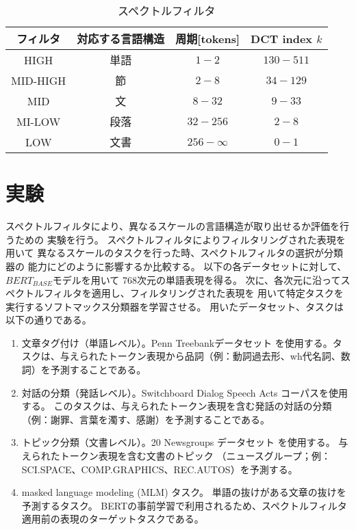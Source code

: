 \documentclass{jsarticle}
\begin{document}
\begin{table}[H]
  \begin{center}
    \caption{スペクトルフィルタ}
    \begin{tabular}{cccc} \hline
      フィルタ  & 対応する言語構造 & 周期[tokens] & DCT index $k$  \\ \hline 
      HIGH     & 単語 & $1-2$        & $130 - 511$    \\
      MID-HIGH & 節   & $2-8$        & $34 - 129$  \\
      MID      & 文   & $8-32$       & $9 - 33$  \\ 
      MI-LOW   & 段落 & $32-256$     & $2 - 8$ \\
      LOW      & 文書 & $256-\infty$ & $0 - 1$ 
      \\ \hline
    \end{tabular}
    \label{tab:tab1}
  \end{center}
\end{table}

\section{実験}
スペクトルフィルタにより、異なるスケールの言語構造が取り出せるか評価を行うための
実験を行う。
スペクトルフィルタによりフィルタリングされた表現を用いて
異なるスケールのタスクを行った時、スペクトルフィルタの選択が分類器の
能力にどのように影響するか比較する。
以下の各データセットに対して、$BERT_{BASE}$モデル\cite{devlin2019bert}を用いて
768次元の単語表現を得る。
次に、各次元に沿ってスペクトルフィルタを適用し、フィルタリングされた表現を
用いて特定タスクを実行するソフトマックス分類器を学習させる。
用いたデータセット、タスクは以下の通りである。

\begin{enumerate}
  \item 文章タグ付け（単語レベル）。Penn Treebankデータセット
  を使用する。タスクは、与えられたトークン表現から品詞（例：動詞過去形、wh代名詞、数詞）を予測することである。
  \item 対話の分類（発話レベル）。Switchboard Dialog Speech Acts コーパスを使用する。
  このタスクは、与えられたトークン表現を含む発話の対話の分類
  （例：謝罪、言葉を濁す、感謝）を予測することである。
  \item トピック分類（文書レベル）。20 Newsgroups データセット を使用する。
  与えられたトークン表現を含む文書のトピック
  （ニュースグループ；例：SCI.SPACE、COMP.GRAPHICS、REC.AUTOS）を予測する。
  \item masked language modeling (MLM) タスク。
  単語の抜けがある文章の抜けを予測するタスク。
  BERTの事前学習で利用されるため、スペクトルフィルタ適用前の表現のターゲットタスクである。
\end{enumerate}
\end{document}
